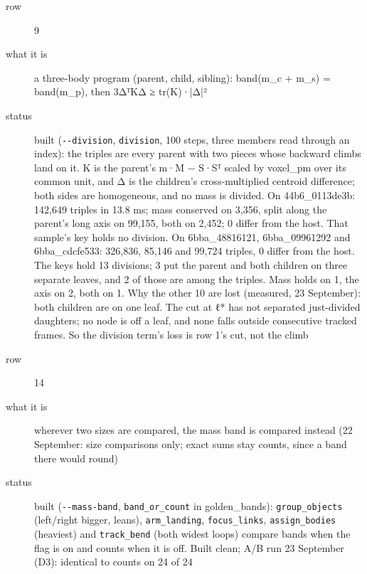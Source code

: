 \begin{description}
\item[{row}] 9
\item[{what it is}] a three-body program (parent, child, sibling): band(m\_\allowbreak{}c + m\_\allowbreak{}s) = band(m\_\allowbreak{}p), then 3ΔᵀKΔ ≥ tr(K)·|Δ|²
\item[{status}] built (\texttt{-\allowbreak{}-\allowbreak{}division}, \texttt{division}, 100 steps, three members read through an index): the triples are every parent with two pieces whose backward climbs land on it. K is the parent's m·M − S·Sᵀ scaled by voxel\_\allowbreak{}pm over its common unit, and Δ is the children's cross-multiplied centroid difference; both sides are homogeneous, and no mass is divided. On 44b6\_\allowbreak{}0113de3b: 142,649 triples in 13.8 ms; mass conserved on 3,356, split along the parent's long axis on 99,155, both on 2,452; 0 differ from the host. That sample's key holds no division. On 6bba\_\allowbreak{}48816121, 6bba\_\allowbreak{}09961292 and 6bba\_\allowbreak{}cdcfe533: 326,836, 85,146 and 99,724 triples, 0 differ from the host. The keys hold 13 divisions; 3 put the parent and both children on three separate leaves, and 2 of those are among the triples. Mass holds on 1, the axis on 2, both on 1. Why the other 10 are lost (measured, 23 September): both children are on one leaf. The cut at ℓ* has not separated just-divided daughters; no node is off a leaf, and none falls outside consecutive tracked frames. So the division term's loss is row 1's cut, not the climb
\end{description}

\begin{description}
\item[{row}] 14
\item[{what it is}] wherever two sizes are compared, the mass band is compared instead (22 September: size comparisons only; exact sums stay counts, since a band there would round)
\item[{status}] built (\texttt{-\allowbreak{}-\allowbreak{}mass-\allowbreak{}band}, \texttt{band\_\allowbreak{}or\_\allowbreak{}count} in golden\_\allowbreak{}bands): \texttt{group\_\allowbreak{}objects} (left/right bigger, leans), \texttt{arm\_\allowbreak{}landing}, \texttt{focus\_\allowbreak{}links}, \texttt{assign\_\allowbreak{}bodies} (heaviest) and \texttt{track\_\allowbreak{}bend} (both widest loops) compare bands when the flag is on and counts when it is off. Built clean; A/B run 23 September (D3): identical to counts on 24 of 24
\end{description}

